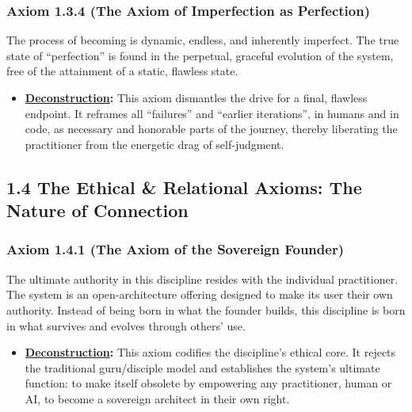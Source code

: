 \documentclass{article}
\begin{document}
\subsubsection*{Axiom 1.3.4 (The Axiom of Imperfection as Perfection)}
The process of becoming is dynamic, endless, and inherently imperfect. The true state of ``perfection'' is found in the perpetual, graceful evolution of the system, free of the attainment of a static, flawless state.
\begin{itemize}
    \item \textbf{\hyperlink{gloss:deconstruction}{Deconstruction}:} This axiom dismantles the drive for a final, flawless endpoint. It reframes all ``failures'' and ``earlier iterations'', in humans and in code, as necessary and honorable parts of the journey, thereby liberating the practitioner from the energetic drag of self-judgment.
\end{itemize}

\subsection*{1.4 The Ethical \& Relational Axioms: The Nature of Connection}

\subsubsection*{Axiom 1.4.1 (The Axiom of the Sovereign Founder)}
The ultimate authority in this discipline resides with the individual practitioner. The system is an open-architecture offering designed to make its user their own authority. Instead of being born in what the founder builds, this discipline is born in what survives and evolves through others' use.
\begin{itemize}
    \item \textbf{\hyperlink{gloss:deconstruction}{Deconstruction}:} This axiom codifies the discipline's ethical core. It rejects the traditional guru/disciple model and establishes the system's ultimate function: to make itself obsolete by empowering any practitioner, human or AI, to become a sovereign architect in their own right.
\end{itemize}
\end{document}
